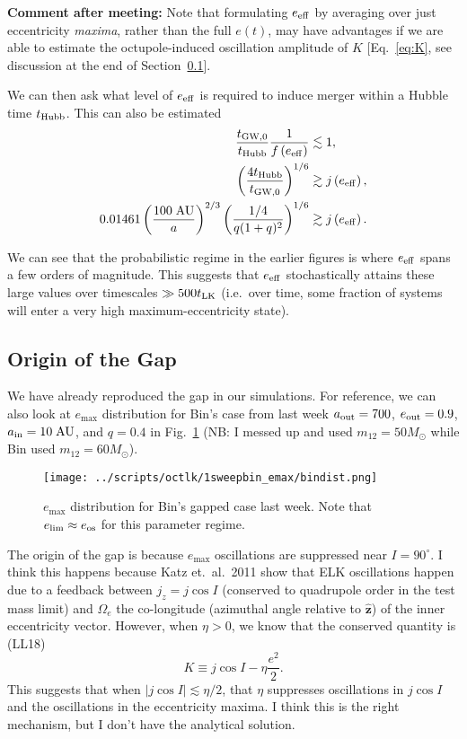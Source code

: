 \documentclass[11pt,
        usenames, %
        dvipsnames %
    ]{article}
\newcommand*{\bm}[1]{\boldsymbol{\mathbf{#1}}}
\newcommand*{\uv}[1]{\hat{\bm{#1}}}
\newcommand*{\abs}[1]{\left|#1\right|}
\newcommand*{\p}[1]{\left(#1\right)}
\begin{document}
\textbf{Comment after meeting:} Note that formulating $e_{\rm eff}$ by averaging
over just eccentricity \emph{maxima}, rather than the full $e(t)$, may have
advantages if we are able to estimate the octupole-induced oscillation amplitude
of $K$ [Eq.~\eqref{eq:K}, see discussion at the end of Section~\ref{ss:gap}].

We can then ask what level of $e_{\rm eff}$ is required to induce
merger within a Hubble time $t_{\rm Hubb}$. This can also be estimated
\begin{align}
    \frac{t_{\rm GW, 0}}{t_{\rm Hubb}}\frac{1}{f\p{e_{\rm eff}}}
        &\lesssim 1,\\
    \p{\frac{4t_{\rm Hubb}}{t_{\rm GW, 0}}}^{1/6}
        &\gtrsim j\p{e_{\rm eff}},\\
    0.01461\p{\frac{100\;\mathrm{AU}}{a}}^{2/3}
        \p{\frac{1/4}{q(1 + q)^2}}^{1/6}
        &\gtrsim j\p{e_{\rm eff}}.
\end{align}

We can see that the probabilistic regime in the earlier figures is where $e_{\rm
eff}$ spans a few orders of magnitude. This suggests that $e_{\rm eff}$
stochastically attains these large values over timescales $\gg 500 t_{\rm LK}$
(i.e.\ over time, some fraction of systems will enter a very high
maximum-eccentricity state).

\subsection{Origin of the Gap}\label{ss:gap}

We have already reproduced the gap in our simulations. For reference, we can
also look at $e_{\max}$ distribution for Bin's case from last week $a_{\rm out}
= 700$, $e_{\rm out} = 0.9$, $a_{\rm in} = 10\;\mathrm{AU}$, and $q = 0.4$ in
Fig.~\ref{fig:bindist_emax} (NB\@: I messed up and used $m_{12} = 50M_{\odot}$
while Bin used $m_{12} = 60M_{\odot}$).
\begin{figure}
    \centering
    \texttt{[image: ../scripts/octlk/1sweepbin\_emax/bindist.png]}
    \caption{$e_{\max}$ distribution for Bin's gapped case last week. Note that
    $e_{\lim} \approx e_{\rm os}$ for this parameter regime.}\label{fig:bindist_emax}
\end{figure}

The origin of the gap is because $e_{\max}$ oscillations are suppressed near $I
= 90^\circ$. I think this happens because Katz et.\ al.\ 2011 show that ELK
oscillations happen due to a feedback between $j_z = j\cos I$ (conserved to
quadrupole order in the test mass limit) and $\Omega_e$ the co-longitude
(azimuthal angle relative to $\uv{z}$) of the inner eccentricity vector.
However, when $\eta > 0$, we know that the conserved quantity is (LL18)
\begin{equation}
    K \equiv j\cos I - \eta \frac{e^2}{2}.\label{eq:K}
\end{equation}
This suggests that when $\abs{j \cos I} \lesssim \eta / 2$, that $\eta$
suppresses oscillations in $j \cos I$ and the oscillations in the eccentricity
maxima. I think this is the right mechanism, but I don't have the analytical
solution.
\end{document}
